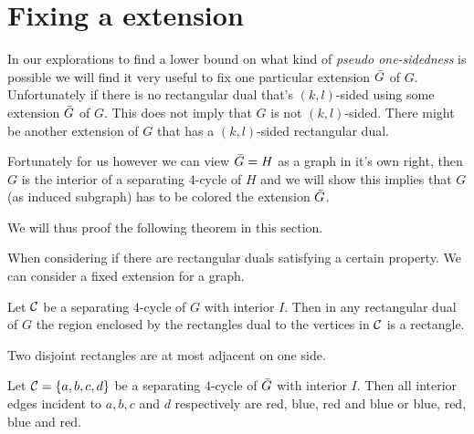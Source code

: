 
\section{Fixing a extension}
In our explorations to find a lower bound on what kind of \emph{pseudo one-sidedness} is possible we will find it very useful to fix one particular extension $\bar{G}$ of $G$. Unfortunately if there is no rectangular dual that's $(k,l)$-sided using some extension $\bar{G}$ of $G$. This does not imply that $G$ is not $(k,l)$-sided. There might be another extension of $G$ that has a $(k,l)$-sided rectangular dual.

Fortunately for us however we can view $\bar{G} = H$ as a graph in it's own right, then $G$ is the interior of a separating $4$-cycle of $H$ and we will show this implies that $G$ (as induced subgraph) has to be colored  the extension $\bar{G}$.

We will thus proof the following theorem in this section.
\begin{thrm}
\label{th:fixExtension}
When considering if there are rectangular duals satisfying a certain property. We can consider a fixed extension for a graph.
\end{thrm}

\begin{remark}
\label{re:interiorRectangle}
Let $\mathcal{C}$ be a separating $4$-cycle of $G$ with interior $I$. Then in any rectangular dual of $G$ the region enclosed by the rectangles dual to the vertices in $\mathcal{C}$ is a rectangle.
\end{remark}

\begin{remark}
\label{re:disjointRectanglesOnlyHaveOneAdjecentSide}
Two disjoint rectangles are at most adjacent on one side.
\end{remark}

\begin{lemma}
\label{lm:fourCycleUnicolor}
Let $\mathcal{C} = \left\lbrace {a, b, c, d} \right\rbrace$ be a separating $4$-cycle of $\bar{G}$ with interior $I$. Then all interior edges incident to $a, b, c$ and $d$ respectively are red, blue, red and blue or blue, red, blue and red.
\end{lemma}

